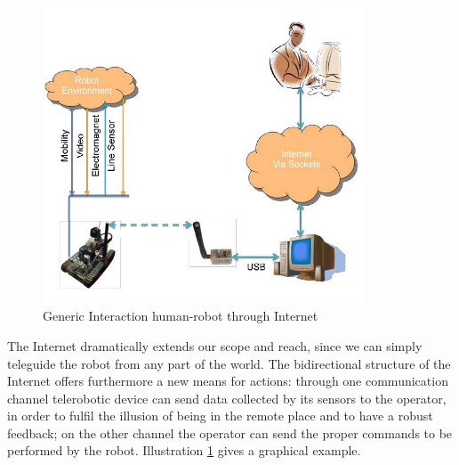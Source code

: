 \begin{figure}
  \begin{center}
    \includegraphics[width=270pt]{img/user_robot_inter.jpg}
    \caption{Generic Interaction human-robot through Internet}
    \label{fig:user_robot_inter}
  \end{center}
\end{figure}

The Internet dramatically extends our scope and reach, since we can simply
teleguide the robot from any part of the world. The bidirectional
structure of the Internet offers furthermore a new means for actions:
through one communication channel telerobotic device can send data
collected by its sensors to the operator, in order to fulfil the
illusion of being in the remote place and to have a robust feedback;
on the other channel the operator can send the proper commands to
be performed by the robot. Illustration \ref{fig:user_robot_inter}
gives a graphical example.
